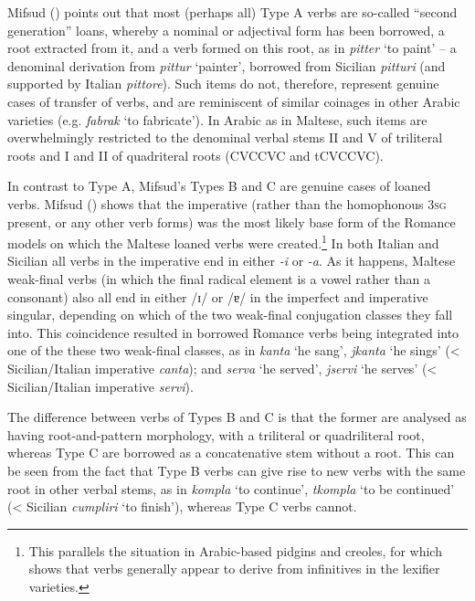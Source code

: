 \documentclass[output=paper]{langsci/langscibook}
\begin{document}
Mifsud (\citeyear[58]{mifsudloanverbs}) points out that most (perhaps all) Type A verbs are so-called ``second generation'' loans, whereby a nominal or adjectival form has been borrowed, a root extracted from it, and a verb formed on this root, as in \textit{pitter} `to paint' -- a denominal derivation from \textit{pittur} `painter', borrowed from Sicilian \textit{pitturi} (and supported by Italian \textit{pittore}). Such items do not, therefore, represent genuine cases of transfer of verbs, and are reminiscent of similar coinages in other Arabic varieties (e.g. \textit{fabrak} `to fabricate'). In Arabic as in Maltese, such items are overwhelmingly restricted to the denominal verbal stems II and V of triliteral roots and I and II of quadriteral roots (CVCCVC and tCVCCVC). 

In contrast to Type A, Mifsud's Types B and C are genuine cases of loaned verbs. Mifsud (\citeyear[110--116]{mifsudloanverbs}) shows that the imperative (rather than the homophonous 3\textsc{sg} present, or any other verb forms) was the most likely base form of the Romance models on which the Maltese loaned verbs were created.\footnote{This parallels the situation in Arabic-based pidgins and creoles, for which \cite{Versteegh2014pidgin} shows that verbs generally appear to derive from infinitives in the lexifier varieties.} In both Italian and Sicilian all verbs in the imperative end in either \textit{-i} or \textit{-a}. As it happens, Maltese weak-final verbs (in which the final radical element is a vowel rather than a consonant) also all end in either /ɪ/ or /ɐ/ in the imperfect and imperative singular, depending on which of the two weak-final conjugation classes they fall into. This coincidence resulted in borrowed Romance verbs being integrated into one of the these two weak-final classes, as in \textit{kanta} `he sang', \textit{jkanta} `he sings' (< Sicilian/Italian imperative \textit{canta}); and \textit{serva} `he served', \textit{jservi} `he serves' (< Sicilian/Italian imperative \textit{servi}).

The difference between verbs of Types B and C is that the former are analysed as having root-and-pattern morphology, with a triliteral or quadriliteral root, whereas Type C are borrowed as a concatenative stem without a root. This can be seen from the fact that Type B verbs can give rise to new verbs with the same root in other verbal stems, as in \textit{kompla} `to continue', \textit{tkompla} `to be continued' (< Sicilian \textit{cumpliri} `to finish'), whereas Type C verbs cannot.
\end{document}
